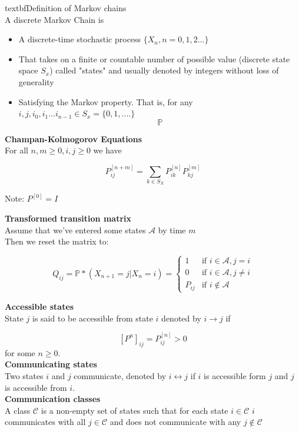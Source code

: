 textbf{Definition of Markov chains}\\

A discrete Markov Chain is
\begin{itemize}
	\item A discrete-time stochastic process $\{X_n, n=0,1,2... \}$
	\item That takes on a finite or countable number of possible value (discrete state space $S_x$) called "states" and usually denoted by integers without loss of generality
	\item Satisfying the Markov property. That is, for any $i, j, i_0, i_1...i_{n-1} \in S_x = \{ 0,1,....\}$
	$$ \mathbb{P} $$
\end{itemize}


\textbf{Champan-Kolmogorov Equations}\\
For all $n, m \geq 0, i, j \geq 0$ we have

$$P_{ij}^{[n+m]} = \sum_{k\in S_X} P_{ik}^{[n]} P_{kj}^{[m]}$$

Note: $P^{[0]} = I$

\textbf{Transformed transition matrix}\\
Assume that we've entered some states $\mathcal{A}$ by time $m$\\

Then we reset the matrix to:

$$Q_{ij} = \mathbb{P}*(X_{n+1} = j|X_n = i) = \begin{cases} 1 & \text{if }i \in \mathcal{A}, j= i \\ 0 & \text{if }i\in \mathcal{A}, j \neq i \\ P_{ij} & \text{if } i \not \in \mathcal{A} \end{cases}$$

\textbf{Accessible states}\\

State $j$ is said to be accessible from state $i$ denoted by $i \rightarrow j$ if

$$[P^n]_{ij} = P_{ij}^[n] > 0$$
for some $n \geq 0$.\\

\textbf{Communicating states}\\
Two states $i$ and $j$ communicate, denoted by $i \leftrightarrow j$ if $i$ is accessible form $j$ and $j$ is accessible from $i$.\\

\textbf{Communication classes}\\
A class $\mathcal{C}$ is a non-empty set of states such that for each state $i \in \mathcal{C}$ $i$ communicates with all $j \in \mathcal{C}$ and does not communicate with any $j \not \in \mathcal{C}$\\

